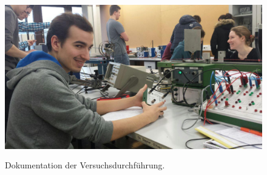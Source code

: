 \begin{figure}[H]
  \centering
  \includegraphics[height=7cm]{wichtig.jpg}
  \caption{Dokumentation der Versuchsdurchführung.}
  \label{fig:original4}
\end{figure}

\printbibliography


